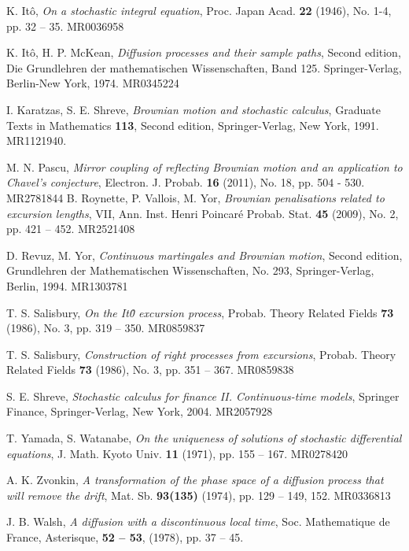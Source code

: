 \documentclass[reqno]{amsart}
\theoremstyle{definition}
\theoremstyle{remark}
\numberwithin{equation}{section}
\begin{document}
\begin{thebibliography}{RoVaYo}
 K. It\^{o}, \textit{On a stochastic integral equation}, Proc. Japan Acad. \textbf{22} (1946), No. 1-4, pp. 32 -- 35. MR0036958

 K. It\^{o}, H. P. McKean, \textit{Diffusion processes and their sample paths}, Second edition, Die Grundlehren der mathematischen Wissenschaften, Band 125. Springer-Verlag, Berlin-New York, 1974. MR0345224

 I. Karatzas, S. E. Shreve, \textit{Brownian motion and stochastic calculus}, Graduate Texts in Mathematics \textbf{113}, Second edition, Springer-Verlag, New York, 1991. MR1121940.

 M. N. Pascu, \textit{Mirror coupling of reflecting Brownian motion and an application to Chavel's conjecture}, Electron. J. Probab. \textbf{16} (2011), No. 18, pp. 504 - 530. MR2781844
 B. Roynette, P. Vallois, M. Yor, \textit{Brownian penalisations related to excursion lengths}, VII, Ann. Inst. Henri Poincaré Probab. Stat. \textbf{45} (2009), No. 2, pp. 421 -- 452. MR2521408

 D. Revuz, M. Yor, \textit{Continuous martingales and Brownian motion}, Second edition, Grundlehren der Mathematischen Wissenschaften, No. 293, Springer-Verlag, Berlin, 1994. MR1303781

 T. S. Salisbury, \textit{On the It\^{0} excursion process}, Probab. Theory Related Fields \textbf{73} (1986), No. 3, pp. 319 -- 350. MR0859837

 T. S. Salisbury, \textit{Construction of right processes from excursions}, Probab. Theory Related Fields \textbf{73} (1986), No. 3, pp. 351 -- 367. MR0859838

 S. E. Shreve, \textit{Stochastic calculus for finance II. Continuous-time models}, Springer Finance, Springer-Verlag, New York, 2004. MR2057928

 T. Yamada, S. Watanabe, \textit{On the uniqueness of solutions of stochastic differential equations}, J. Math. Kyoto Univ. \textbf{11} (1971), pp. 155 -- 167. MR0278420

 A. K. Zvonkin, \textit{A transformation of the phase space of a diffusion process that will remove the drift}, Mat. Sb. \textbf{93(135)} (1974), pp. 129 -- 149, 152. MR0336813

 J. B. Walsh, \textit{A diffusion with a discontinuous local time}, Soc. Mathematique de France, Asterisque, \textbf{52 -- 53}, (1978), pp. 37 -- 45.

\end{thebibliography}
\end{document}
